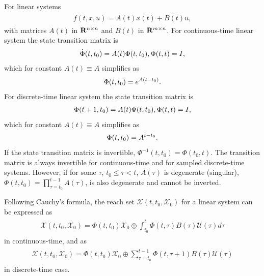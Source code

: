 \documentclass[letterpaper,10pt,english]{sphinxmanual}
\begin{document}
For linear systems
\label{chap_reach:equation-linearrhs}\begin{gather}
\begin{split}f(t, x, u) = A(t)x(t) + B(t)u,\end{split}\label{chap_reach-linearrhs}
\end{gather}
with matrices \(A(t)\) in \({\bf R}^{n\times n}\) and
\(B(t)\) in \({\bf R}^{m\times n}\). For continuous-time linear
system the state transition matrix is
\begin{gather}
\begin{split}\dot{\Phi}(t, t_0) = A(t)\Phi(t, t_0), \Phi(t, t) = I,\end{split}\notag
\end{gather}
which for constant \(A(t)\equiv A\) simplifies as
\begin{gather}
\begin{split}\Phi(t, t_0) = e^{A(t-t_0)} .\end{split}\notag
\end{gather}
For discrete-time linear system the state transition matrix is
\begin{gather}
\begin{split}\Phi(t+1, t_0) = A(t)\Phi(t, t_0), \Phi(t, t) = I,\end{split}\notag
\end{gather}
which for constant \(A(t)\equiv A\) simplifies as
\begin{gather}
\begin{split}\Phi(t, t_0) = A^{t-t_0} .\end{split}\notag
\end{gather}
If the state transition matrix is invertible,
\(\Phi^{-1}(t, t_0) = \Phi(t_0, t)\). The transition matrix is
always invertible for continuous-time and for sampled discrete-time
systems. However, if for some \(\tau\), \(t_0\leqslant\tau<t\),
\(A(\tau)\) is degenerate (singular),
\(\Phi(t, t_0)=\prod_{\tau=t_0}^{t-1}A(\tau)\), is also degenerate
and cannot be inverted.

Following Cauchy’s formula, the reach set
\({\mathcal X}(t, t_0, {\mathcal X}_0)\) for a linear system can be
expressed as
\label{chap_reach:equation-ctlsrs}\begin{gather}
\begin{split}{\mathcal X}(t, t_0, {\mathcal X}_0) =
\Phi(t, t_0){\mathcal X}_0 \oplus \int_{t_0}^t\Phi(t, \tau)B(\tau){\mathcal U}(\tau)d\tau\end{split}\label{chap_reach-ctlsrs}
\end{gather}
in continuous-time, and as
\label{chap_reach:equation-dtlsrs}\begin{gather}
\begin{split}{\mathcal X}(t, t_0, {\mathcal X}_0) =
\Phi(t, t_0){\mathcal X}_0 \oplus \sum_{\tau=t_0}^{t-1}\Phi(t, \tau+1)B(\tau){\mathcal U}(\tau)\end{split}\label{chap_reach-dtlsrs}
\end{gather}
in discrete-time case.
\end{document}
